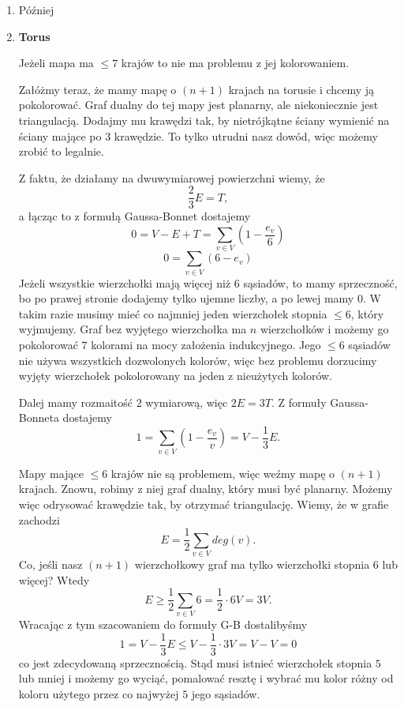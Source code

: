 \begin{enumerate}[label=\texbtf{(\alph*)}]
  \item Później
  \item 

    \textbf{Torus} \dotfill

    Jeżeli mapa ma $\leq 7$ krajów to nie ma problemu z jej kolorowaniem. 

    Załóżmy teraz, że mamy mapę o $(n+1)$ krajach na torusie i chcemy ją pokolorować. Graf dualny do tej mapy jest planarny, ale niekoniecznie jest triangulacją. Dodajmy mu krawędzi tak, by nietrójkątne ściany wymienić na ściany mające po $3$ krawędzie. To tylko utrudni nasz dowód, więc możemy zrobić to legalnie.

    Z faktu, że działamy na dwuwymiarowej powierzchni wiemy, że 
    $$\frac{2}{3}E=T,$$
    a łącząc to z formułą Gaussa-Bonnet dostajemy
    $$0=V-E+T=\sum_{v\in V}(1-\frac{e_v}{6})$$
    $$0=\sum_{v\in V}(6-e_v)$$
    Jeżeli wszystkie wierzchołki mają więcej niż $6$ sąsiadów, to mamy sprzeczność, bo po prawej stronie dodajemy tylko ujemne liczby, a po lewej mamy $0$. W takim razie musimy mieć co najmniej jeden wierzchołek stopnia $\leq 6$, który wyjmujemy. Graf bez wyjętego wierzchołka ma $n$ wierzchołków i możemy go pokolorować $7$ kolorami na mocy założenia indukcyjnego. Jego $\leq 6$ sąsiadów nie używa wszystkich dozwolonych kolorów, więc bez problemu dorzucimy wyjęty wierzchołek pokolorowany na jeden z nieużytych kolorów.

     \dotfill

    Dalej mamy rozmaitość $2$ wymiarową, więc $2E=3T$. Z formuły Gaussa-Bonneta dostajemy
    $$1=\sum_{v\in V}(1-\frac{e_v}{v})=V-\frac{1}{3}E.$$

    Mapy mające $\leq 6$ krajów nie są problemem, więc weźmy mapę o $(n+1)$ krajach. Znowu, robimy z niej graf dualny, który musi być planarny. Możemy więc odrysować krawędzie tak, by otrzymać triangulację. Wiemy, że w grafie zachodzi
    $$E=\frac{1}{2}\sum_{v\in V}deg(v).$$
    Co, jeśli nasz $(n+1)$ wierzchołkowy graf ma tylko wierzchołki stopnia $6$ lub więcej? Wtedy
    $$E\geq \frac{1}{2}\sum_{v\in V}6=\frac{1}{2}\cdot 6V=3V.$$
    Wracając z tym szacowaniem do formuły G-B dostalibyśmy
    $$1=V-\frac{1}{3}E\leq V-\frac{1}{3}\cdot 3V=V-V=0$$
    co jest zdecydowaną sprzecznością. Stąd musi istnieć wierzchołek stopnia $5$ lub mniej i możemy go wyciąć, pomalować resztę i wybrać mu kolor różny od koloru użytego przez co najwyżej $5$ jego sąsiadów.


\end{enumerate}
